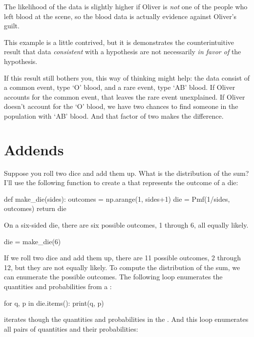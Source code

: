 \documentclass[12pt]{book}
\theoremstyle{exercise}
\begin{document}
The likelihood of the data is slightly higher if Oliver is
{\it not} one of the people who left blood at the scene, so
the blood data is actually evidence against Oliver's guilt.


This example is a little contrived, but it is demonstrates
the counterintuitive result that data {\it consistent} with
a hypothesis are not necessarily {\it in favor of}
the hypothesis.

If this result still bothers you, this way of thinking might help: the data consist of a common event, type `O' blood, and a rare event, type `AB' blood.
If Oliver accounts for the common event, that leaves the rare
event unexplained.  If Oliver doesn't account for the
`O' blood, we have two chances to find someone in the
population with `AB' blood.  And that factor of two makes
the difference.


\section{Addends}
\label{addends}

Suppose you roll two dice and add them up.  What is the distribution of the sum?
I'll use the following function to create a  that represents the outcome of a die:

\begin{code}
def make_die(sides):
    outcomes = np.arange(1, sides+1)
    die = Pmf(1/sides, outcomes)
    return die
\end{code}

On a six-sided die, there are six possible outcomes, 1 through 6, all equally likely.

\begin{code}
die = make_die(6)
\end{code}

If we roll two dice and add them up, there are 11 possible outcomes, 2 through 12, but they are not equally likely.
To compute the distribution of the sum, we can enumerate the possible outcomes.
The following loop enumerates the quantities and probabilities from a :

\begin{code}
for q, p in die.items():
    print(q, p)
\end{code}

 iterates though the quantities and probabilities in the .
And this loop enumerates all pairs of quantities and their probabilities:
\end{document}
